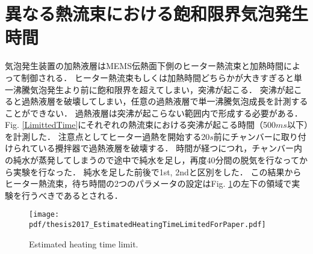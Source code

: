 \section{異なる熱流束における飽和限界気泡発生時間}
気泡発生装置の加熱液層はMEMS伝熱面下側のヒーター熱流束と加熱時間によって制御される．
ヒーター熱流束もしくは加熱時間どちらかが大きすぎると単一沸騰気泡発生より前に飽和限界を超えてしまい，突沸が起こる．
突沸が起こると過熱液層を破壊してしまい，任意の過熱液層で単一沸騰気泡成長を計測することができない．
過熱液層は突沸が起こらない範囲内で形成する必要がある．
Fig. \ref{LimittedTime}にそれぞれの熱流束における突沸が起こる時間（500$ms$以下）を計測した．
注意点としてヒーター過熱を開始する20$s$前にチャンバーに取り付けられている攪拌器で過熱液層を破壊する．
時間が経つにつれ，チャンバー内の純水が蒸発してしまうので途中で純水を足し，再度40分間の脱気を行なってから実験を行なった．
純水を足した前後で1st, 2ndと区別をした．
この結果からヒーター熱流束，待ち時間の2つのパラメータの設定はFig. \ref{EstimatedHeatingTimeLimit}の左下の領域で実験を行うべきであるとされる．


  
\vspace{-1zh}
\begin{figure}[ht]
 \begin{center}
  \texttt{[image: pdf/thesis2017\_EstimatedHeatingTimeLimitedForPaper.pdf]}
  \vspace{-2zh}
  \caption{Estimated heating time limit.}\label{EstimatedHeatingTimeLimit}
 \end{center}
\end{figure}
 \vspace{-2zh}
